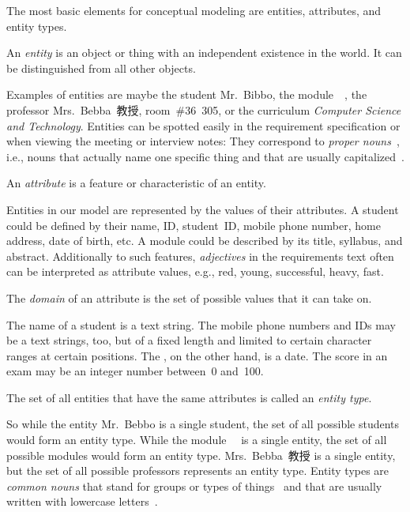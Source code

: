 %
%
%
The most basic elements for conceptual modeling are entities, attributes, and entity types.%
%
\begin{definition}[Entity]%
\label{def:entity}%
An \emph{entity} is an object or thing with an independent existence in the world. %
It can be distinguished from all other objects.%
\end{definition}%
%
Examples of entities are maybe the student Mr.~Bibbo, the module~~\cite{programmingWithPython}, the professor Mrs.~Bebba~教授, room~\#36~305, or the curriculum \emph{Computer Science and Technology}.
Entities can be spotted easily in the requirement specification or when viewing the meeting or interview notes:
They correspond to \emph{proper nouns}~\cite{S2024D:CDMERDE}, i.e., nouns that actually name one specific thing and that are usually capitalized~\cite{EOWM2025MWAMTD:CAPNWTDLWOGC}.%
%
\begin{definition}[Attribute]%
An \emph{attribute} is a feature or characteristic of an entity.%
\end{definition}%
%
Entities in our model are represented by the values of their attributes.
A student could be defined by their name, ID, student~ID, mobile phone number, home address, date of birth, etc.
A module could be described by its title, syllabus, and abstract.
Additionally to such features, \emph{adjectives} in the requirements text often can be interpreted as attribute values, e.g., red, young, successful, heavy, fast.%
%
\begin{definition}[Domain]%
The \emph{domain} of an attribute is the set of possible values that it can take on.%
\end{definition}%
%
The name of a student is a text string.
The mobile phone numbers and IDs may be a text strings, too, but of a fixed length and limited to certain character ranges at certain positions.
The , on the other hand, is a date.
The score in an exam may be an integer number between~0 and~100.%
%
\begin{definition}%
\label{def:entityType}%
The set of all entities that have the same attributes is called an \emph{entity type}.%
\end{definition}%
%
So while the entity Mr.~Bebbo is a single student, the set of all possible students would form an entity type.
While the module~~\cite{programmingWithPython} is a single entity, the set of all possible modules would form an entity type.
Mrs.~Bebba~教授 is a single entity, but the set of all possible professors represents an entity type.
Entity types are \emph{common nouns} that stand for groups or types of things~\cite{S2024D:CDMERDE} and that are usually written with lowercase letters~\cite{EOWM2025MWAMTD:CAPNWTDLWOGC}.

